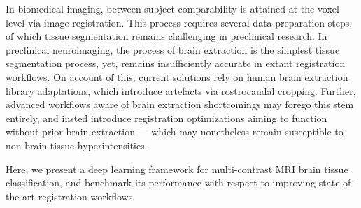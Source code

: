 In biomedical imaging, between-subject comparability is attained at the voxel level via image registration.
This process requires several data preparation steps, of which tissue segmentation remains challenging in preclinical research.
In preclinical neuroimaging, the process of brain extraction is the simplest tissue segmentation process, yet, remains insufficiently accurate in extant registration workflows.
On account of this, current solutions rely on human brain extraction library adaptations, which introduce artefacts via rostrocaudal cropping.
Further, advanced workflows aware of brain extraction shortcomings may forego this stem entirely, and insted introduce registration optimizations aiming to function without prior brain extraction --- which may nonetheless remain susceptible to non-brain-tissue hyperintensities.
\vspace{.4em}

Here, we present a deep learning framework for multi-contrast MRI brain tissue classification, and benchmark its performance with respect to improving state-of-the-art registration workflows.
